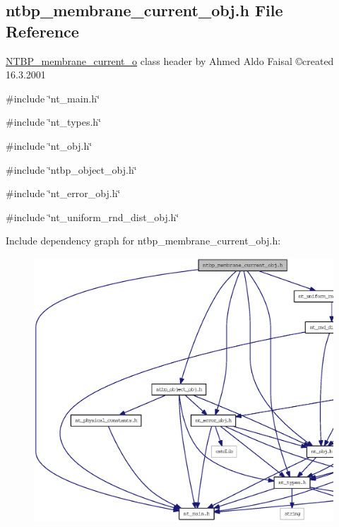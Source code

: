 \subsection{ntbp\_\-membrane\_\-current\_\-obj.h File Reference}
\label{ntbp__membrane__current__obj_8h}



\begin{DoxyItemize}
\item \hyperlink{class_n_t_b_p__membrane__current__o}{NTBP\_\-membrane\_\-current\_\-o} class header by Ahmed Aldo Faisal \copyright created 16.3.2001 
\end{DoxyItemize} 


{\ttfamily \#include \char`\"{}nt\_\-main.h\char`\"{}}\par
{\ttfamily \#include \char`\"{}nt\_\-types.h\char`\"{}}\par
{\ttfamily \#include \char`\"{}nt\_\-obj.h\char`\"{}}\par
{\ttfamily \#include \char`\"{}ntbp\_\-object\_\-obj.h\char`\"{}}\par
{\ttfamily \#include \char`\"{}nt\_\-error\_\-obj.h\char`\"{}}\par
{\ttfamily \#include \char`\"{}nt\_\-uniform\_\-rnd\_\-dist\_\-obj.h\char`\"{}}\par
Include dependency graph for ntbp\_\-membrane\_\-current\_\-obj.h:
\nopagebreak
\begin{figure}[H]
\begin{center}
\leavevmode
\includegraphics[width=400pt]{ntbp__membrane__current__obj_8h__incl}
\end{center}
\end{figure}
